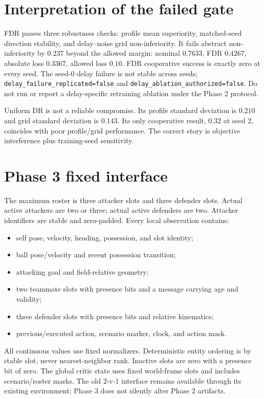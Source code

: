 \documentclass[12pt,twocolumn]{article}
\begin{document}
  {}
  {}

\section{Interpretation of the failed gate}
FDR passes three robustness checks: profile mean superiority, matched-seed direction stability,
and delay--noise grid non-inferiority. It fails abstract non-inferiority by $0.237$ beyond the
allowed margin: nominal $0.7633$, FDR $0.4267$, absolute loss $0.3367$, allowed loss $0.10$.
FDR cooperative success is exactly zero at every seed. The seed-0 delay failure is not stable
across seeds; \texttt{delay\_failure\_replicated=false} and
\texttt{delay\_ablation\_authorized=false}. Do not run or report a delay-specific retraining
ablation under the Phase 2 protocol.

Uniform DR is not a reliable compromise. Its profile standard deviation is $0.210$ and grid
standard deviation is $0.143$. Its only cooperative result, $0.32$ at seed 2, coincides with poor
profile/grid performance. The correct story is objective interference plus training-seed
sensitivity.

\section{Phase 3 fixed interface}
The maximum roster is three attacker slots and three defender slots. Actual active attackers are
two or three; actual active defenders are two. Attacker identifiers are stable and zero-padded.
Every local observation contains:
\begin{itemize}
\item self pose, velocity, heading, possession, and slot identity;
\item ball pose/velocity and recent possession transition;
\item attacking goal and field-relative geometry;
\item two teammate slots with presence bits and a message carrying age and validity;
\item three defender slots with presence bits and relative kinematics;
\item previous/executed action, scenario marker, clock, and action mask.
\end{itemize}
All continuous values use fixed normalizers. Deterministic entity ordering is by stable slot, never
nearest-neighbor rank. Inactive slots are zero with a presence bit of zero. The global critic state
uses fixed world-frame slots and includes scenario/roster masks. The old 2-v-1 interface remains
available through its existing environment; Phase 3 does not silently alter Phase 2 artifacts.
\end{document}
